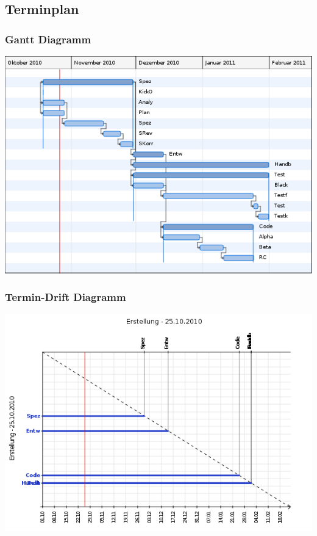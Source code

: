 \documentclass[a4paper,10pt]{scrartcl}
\begin{document}
\begin{tiemize}
\subsection{Terminplan}
\subsubsection{Gantt Diagramm}
\includegraphics[width=15cm]{gantt.png}
\subsubsection{Termin-Drift Diagramm}
\includegraphics[width=15cm]{termindrift.png}

\end{tiemize}
\end{document}
